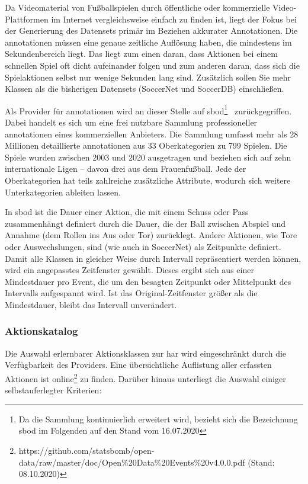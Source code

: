 Da Videomaterial von Fußballspielen durch öffentliche oder kommerzielle Video-Plattformen im Internet vergleichsweise einfach zu finden ist, liegt der Fokus bei der Generierung des Datensets primär im Beziehen akkurater Annotationen.
Die \gls{annotationen} müssen eine genaue zeitliche Auflösung haben, die mindestens im Sekundenbereich liegt.
Das liegt zum einen daran, dass Aktionen bei einem schnellen Spiel oft dicht aufeinander folgen und zum anderen daran, dass sich die Spielaktionen selbst nur wenige Sekunden lang sind.
Zusätzlich sollen Sie mehr Klassen als die bisherigen Datensets (SoccerNet und SoccerDB) einschließen.

Als Provider für \gls{annotationen} wird an dieser Stelle auf \gls{sbod}\footnote{Da die Sammlung kontinuierlich erweitert wird, bezieht sich die Bezeichnung \gls{sbod} im Folgenden auf den Stand vom 16.07.2020}~\cite{Statsbomb20} zurückgegriffen.
Dabei handelt es sich um eine frei nutzbare Sammlung professioneller \gls{annotationen} eines kommerziellen Anbieters.
Die Sammlung umfasst mehr als 28 Millionen detaillierte \gls{annotationen} aus 33 Oberkategorien zu 799 Spielen.
Die Spiele wurden zwischen 2003 und 2020 ausgetragen und beziehen sich auf zehn internationale Ligen -- davon drei aus dem Frauenfußball.
Jede der Oberkategorien hat teils zahlreiche zusätzliche Attribute, wodurch sich weitere Unterkategorien ableiten lassen.

In \gls{sbod} ist die Dauer einer Aktion, die mit einem Schuss oder Pass zusammenhängt definiert durch die Dauer, die der Ball zwischen Abspiel und Annahme (\bzw dem Rollen ins Aus oder Tor) zurücklegt.
Andere Aktionen, wie Tore oder Auswechslungen, sind (wie auch in SoccerNet) als Zeitpunkte definiert.
Damit alle Klassen in gleicher Weise durch Intervall repräsentiert werden können, wird ein angepasstes Zeitfenster gewählt.
Dieses ergibt sich aus einer Mindestdauer pro Event, die um den besagten Zeitpunkt oder Mittelpunkt des Intervalls aufgespannt wird.
Ist das Original-Zeitfenster größer als die Mindestdauer, bleibt das Intervall unverändert.

\subsubsection*{Aktionskatalog}

Die Auswahl erlernbarer Aktionsklassen zur \gls{har} wird eingeschränkt durch die Verfügbarkeit des Providers.
Eine übersichtliche Auflistung aller erfassten Aktionen ist online\footnote{https://github.com/statsbomb/open-data/raw/master/doc/Open\%20Data\%20Events\%20v4.0.0.pdf (Stand: 08.10.2020)} zu finden.
Darüber hinaus unterliegt die Auswahl einiger selbstauferlegter Kriterien:

